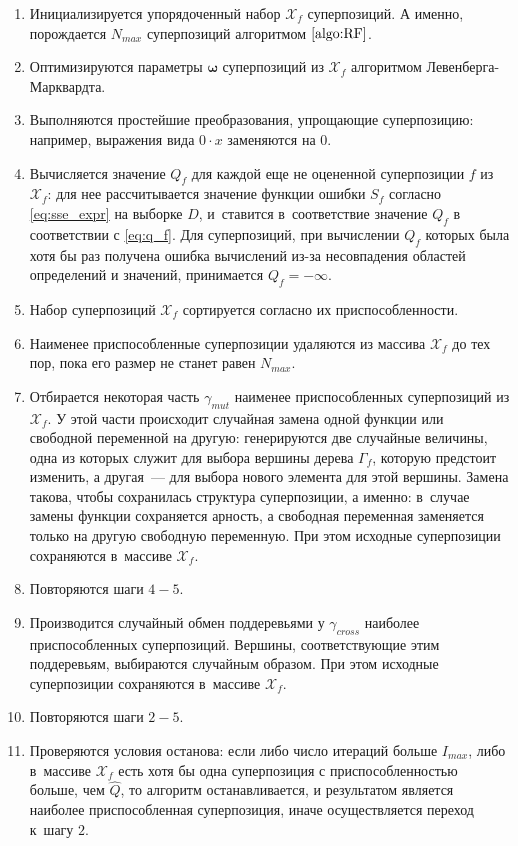 \documentclass[12pt,a4paper]{article}
\begin{document}
\begin{enumerate}
  \item Инициализируется упорядоченный набор $\mathcal{X}_f$ суперпозиций.
	А именно, порождается $N_{max}$ суперпозиций алгоритмом $\ref{algo:RF}$.
  \item Оптимизируются параметры $\boldsymbol{\omega}$ суперпозиций
	из $\mathcal{X}_f$ алгоритмом Левенберга-Марквардта.
  \item Выполняются простейшие преобразования, упрощающие суперпозицию:
	например, выражения вида $0 \cdot x$ заменяются на $0$.
  \item Вычисляется значение $Q_f$ для каждой еще не оцененной суперпозиции
	$f$ из $\mathcal{X}_f$: для нее рассчитывается значение функции ошибки
	$S_f$ согласно \eqref{eq:sse_expr} на выборке $D$, и~ставится
	в~соответствие значение $Q_f$ в соответствии с \eqref{eq:q_f}. Для
	суперпозиций, при вычислении $Q_f$ которых была хотя бы раз получена
	ошибка вычислений из-за несовпадения областей определений и значений,
	принимается $Q_f = -\infty$.
  \item Набор суперпозиций $\mathcal{X}_f$ сортируется согласно их
	приспособленности.
  \item Наименее приспособленные суперпозиции удаляются из массива
	$\mathcal{X}_f$ до тех пор, пока его размер не станет равен $N_{max}$.
  \item Отбирается некоторая часть $\gamma_{mut}$ наименее приспособленных
	суперпозиций из $\mathcal{X}_f$. У этой части происходит случайная замена
	одной функции или свободной переменной на другую: генерируются две случайные величины,
	одна из которых служит для выбора вершины дерева $\Gamma_f$, которую
	предстоит изменить, а другая~--- для выбора нового элемента для этой вершины.
	Замена такова, чтобы сохранилась структура суперпозиции, а именно:
	в~случае замены функции сохраняется арность, а свободная переменная
	заменяется только на другую свободную переменную. При этом исходные
	суперпозиции сохраняются в~массиве $\mathcal{X}_f$.
  \item Повторяются шаги $4-5$.
  \item Производится случайный обмен поддеревьями у $\gamma_{cross}$ наиболее
	приспособленных суперпозиций. Вершины, соответствующие этим поддеревьям,
	выбираются случайным образом. При этом исходные суперпозиции сохраняются
	в~массиве $\mathcal{X}_f$.
  \item Повторяются шаги $2-5$.
  \item Проверяются условия останова: если либо число итераций больше
	$I_{max}$, либо в~массиве $\mathcal{X}_f$ есть хотя бы одна суперпозиция с
	приспособленностью больше, чем $\hat{Q}$, то алгоритм останавливается,
	и результатом является наиболее приспособленная суперпозиция, иначе
	осуществляется переход к~шагу $2$.
\end{enumerate}
\end{document}
